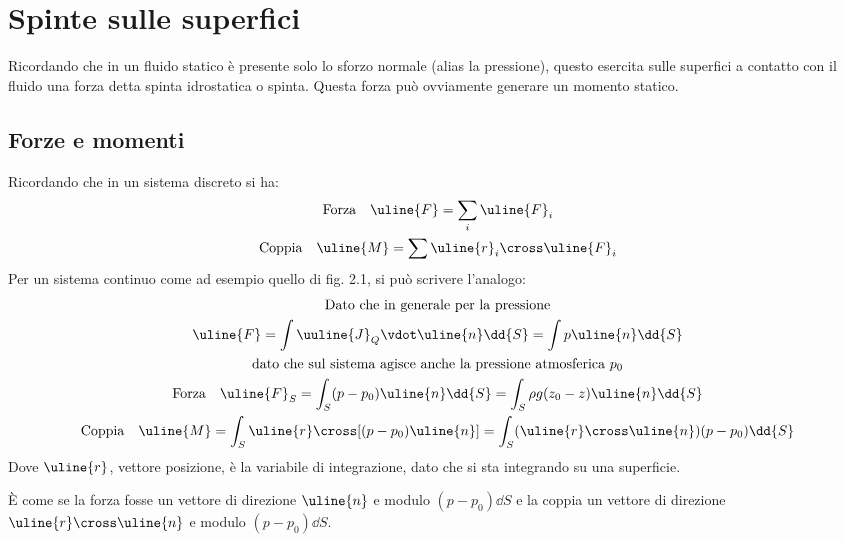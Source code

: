 %
\section{Spinte sulle superfici}
Ricordando che in un fluido statico è presente solo lo sforzo normale (alias la pressione), questo esercita sulle superfici a contatto con il fluido una forza detta spinta idrostatica o spinta.
Questa forza può ovviamente generare un momento statico.

\subsection{Forze e momenti}
Ricordando che in un sistema discreto si ha:
	\begin{equation*}
		\begin{gathered}
			\text{Forza} \quad \uline{F} = \sum_i \uline{F}_i \\
			\text{Coppia} \quad \uline{M} = \sum \uline{r}_i \cross \uline{F}_i
		\end{gathered}
	\end{equation*}
Per un sistema continuo come ad esempio quello di fig. 2.1, si può scrivere l'analogo:
	\begin{equation*}
		\begin{gathered}
			\text{Dato che in generale per la pressione}\\
			\uline{F} = \int \uuline{J}_Q \vdot \uline{n} \dd{S} = \int p \uline{n} \dd{S}\\
			\text{dato che sul sistema agisce anche la pressione atmosferica $p_0$}\\
			\text{Forza} \quad \uline{F}_S =\int_S (p - p_0) \uline{n} \dd{S} = \int_S \rho g (z_0 - z) \uline{n} \dd{S} \\
			\text{Coppia} \quad \uline{M} = \int_S \uline{r} \cross [(p - p_0) \uline{n}]=\int_S (\uline{r} \cross \uline{n}) (p - p_0) \dd{S}
		\end{gathered}
	\end{equation*}
Dove $\uline{r}$, vettore posizione, è la variabile di integrazione, dato che si sta integrando su una superficie.

È come se la forza fosse un vettore di direzione $\uline{n}$ e modulo $(p - p_0) \dd{S}$ e la coppia un vettore di direzione $\uline{r} \cross \uline{n}$ e modulo $(p - p_0) \dd{S}$.

